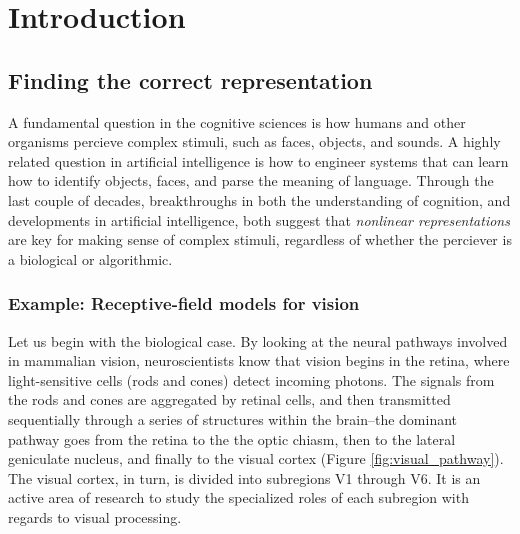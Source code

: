 
\chapter{Introduction} %

\label{Chapter1} %


\newcommand{\keyword}[1]{\textbf{#1}}
\newcommand{\tabhead}[1]{\textbf{#1}}
\newcommand{\code}[1]{\texttt{#1}}
\newcommand{\file}[1]{\texttt{\bfseries#1}}
\newcommand{\option}[1]{\texttt{\itshape#1}}


\section{Finding the correct representation}

A fundamental question in the cognitive sciences is how humans and
other organisms percieve complex stimuli, such as faces, objects, and
sounds.  A highly related question in artificial intelligence is how
to engineer systems that can learn how to identify objects, faces, and
parse the meaning of language.  Through the last couple of decades,
breakthroughs in both the understanding of cognition, and developments
in artificial intelligence, both suggest that \emph{nonlinear
  representations} are key for making sense of complex stimuli,
regardless of whether the perciever is a biological or algorithmic.

\subsection{Example: Receptive-field models for vision}\label{sec:kay2008}

Let us begin with the biological case.  By looking at the neural
pathways involved in mammalian vision, neuroscientists know that
vision begins in the retina, where light-sensitive cells (rods and
cones) detect incoming photons.  The signals from the rods and cones
are aggregated by retinal cells, and then transmitted sequentially
through a series of structures within the brain--the dominant pathway
goes from the retina to the the optic chiasm, then to the lateral
geniculate nucleus, and finally to the visual cortex (Figure
\ref{fig:visual_pathway}).  The visual cortex, in turn, is divided
into subregions V1 through V6.  It is an active area of research to
study the specialized roles of each subregion with regards to visual
processing.

